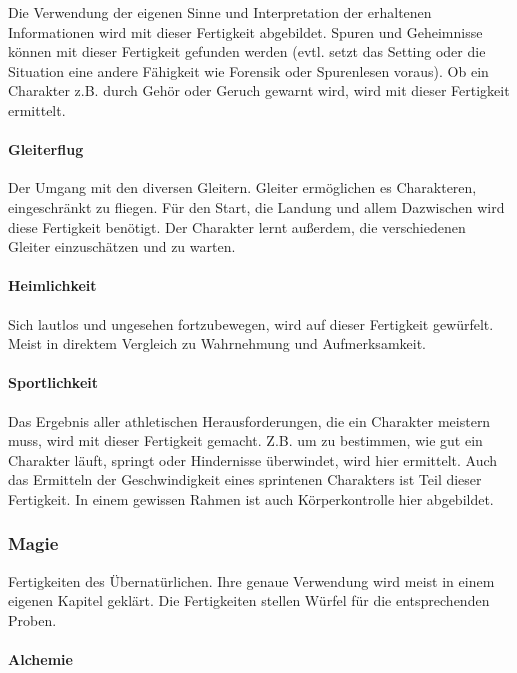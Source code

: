 \documentclass{article}
\begin{document}
Die Verwendung der eigenen Sinne und Interpretation der erhaltenen Informationen wird mit dieser Fertigkeit abgebildet.
Spuren und Geheimnisse können mit dieser Fertigkeit gefunden werden (evtl. setzt das Setting oder die Situation eine
andere Fähigkeit wie Forensik oder Spurenlesen voraus). Ob ein Charakter z.B. durch Gehör oder Geruch gewarnt wird,
wird mit dieser Fertigkeit ermittelt.

\paragraph{Gleiterflug}

Der Umgang mit den diversen Gleitern. Gleiter ermöglichen es Charakteren, eingeschränkt zu fliegen. Für den Start, die
Landung und allem Dazwischen wird diese Fertigkeit benötigt. Der Charakter lernt außerdem, die verschiedenen Gleiter
einzuschätzen und zu warten.

\paragraph{Heimlichkeit}

Sich lautlos und ungesehen fortzubewegen, wird auf dieser Fertigkeit gewürfelt. Meist in direktem Vergleich zu
Wahrnehmung und Aufmerksamkeit.

\paragraph{Sportlichkeit}

Das Ergebnis aller athletischen Herausforderungen, die ein Charakter meistern muss, wird mit dieser Fertigkeit gemacht.
Z.B. um zu bestimmen, wie gut ein Charakter läuft, springt oder Hindernisse überwindet, wird hier ermittelt. Auch das
Ermitteln der Geschwindigkeit eines sprintenen Charakters ist Teil dieser Fertigkeit. In einem gewissen Rahmen ist auch
Körperkontrolle hier abgebildet.


\subsubsection{Magie}

Fertigkeiten des Übernatürlichen. Ihre genaue Verwendung wird meist in einem eigenen Kapitel geklärt. Die
Fertigkeiten stellen Würfel für die entsprechenden Proben.

\paragraph{Alchemie}
\end{document}
